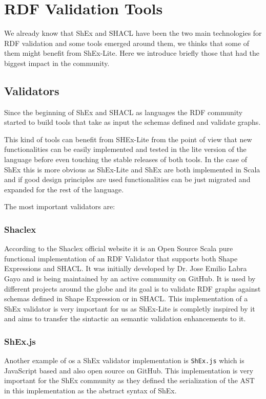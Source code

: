 \section{RDF Validation Tools}

We already know that ShEx and SHACL have been the two main technologies for RDF validation and some tools emerged around them, we thinks that some of them might benefit from ShEx-Lite. Here we introduce briefly those that had the biggest impact in the community.

\subsection{Validators}
Since the beginning of ShEx and SHACL as languages the RDF community started to build tools that take as input the schemas defined and validate graphs.

This kind of tools can benefit from SHEx-Lite from the point of view that new functionalities can be easily implemented and tested in the lite version of the language before even touching the stable releases of both tools. In the case of ShEx this is more obvious as ShEx-Lite and ShEx are both implemented in Scala and if good design principles are used functionalities can be just migrated and expanded for the rest of the language.

The most important validators are:

\subsubsection{Shaclex}
According to the Shaclex official website it is an Open Source Scala pure functional implementation of an RDF Validator that supports both Shape Expressions and SHACL. It was initially developed by Dr. Jose Emilio Labra Gayo and is being maintained by an active community on GitHub. It is used by different projects around the globe and its goal is to validate RDF graphs against schemas defined in Shape Expression or in SHACL.
This implementation of a ShEx validator is very important for us as ShEx-Lite is completly inspired by it and aims to transfer the sintactic an semantic validation enhancements to it.

\subsubsection{ShEx.js}
Another example of os a ShEx validator implementation is \texttt{ShEx.js} which is JavaScript based and also open source on GitHub. This implementation is very important for the ShEx community as they defined the serialization of the AST in this implementation as the abstract syntax of ShEx.


